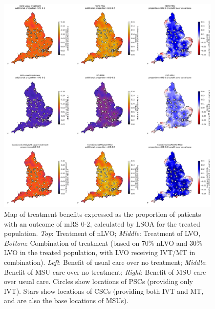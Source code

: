 \begin{figure}[h!]
    \centering
    \includegraphics[width=1\linewidth]{images/map_mrs_0_2.jpg}
    \caption{Map of treatment benefits expressed as the proportion of patients with an outcome of mRS 0-2, calculated by LSOA for the treated population. \textit{Top}: Treatment of nLVO; \textit{Middle}: Treatment of LVO, \textit{Bottom}: Combination of treatment (based on 70\% nLVO and 30\% LVO in the treated population, with LVO receiving IVT/MT in combination). \textit{Left}: Benefit of usual care over no treatment; \textit{Middle}: Benefit of MSU care over no treatment; \textit{Right}: Benefit of MSU care over usual care. Circles show locations of PSCs (providing only IVT). Stars show locations of CSCs (providing both IVT and MT, and are also the base locations of MSUs).}
    \label{fig:msu_map_mrs_0_2}
\end{figure}

